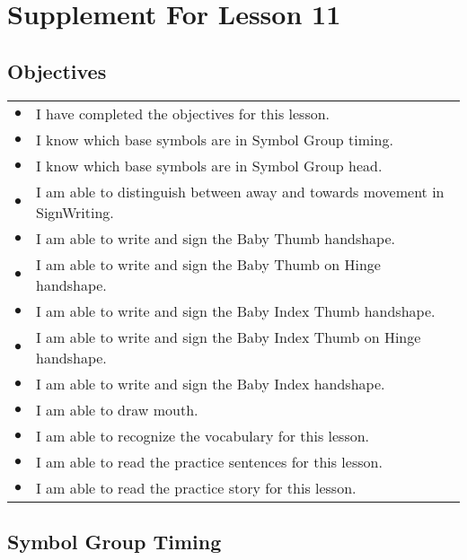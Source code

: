 \documentclass{article}
\begin{document}
\newfontfamily{}
\newfontfamily{}
\newcommand{\bul}{\hfil$\bullet$&}
\renewenvironment{glossary}{\begin{multicols}{5}\begin{center}}{\end{center}\end{multicols}}
\setcounter{secnumdepth}{0}
\setlength{\columnseprule}{1pt}

\section{Supplement For Lesson 11}

\subsection{Objectives}

\begin{tabular}{p{1cm}p{14cm}}
\bul I have completed the objectives for this lesson.\\
\bul I know which base symbols are in Symbol Group timing.\\
\bul I know which base symbols are in Symbol Group head.\\
\bul I am able to distinguish between away and towards movement in SignWriting.\\
\bul I am able to write and sign the Baby Thumb handshape.\\
\bul I am able to write and sign the Baby Thumb on Hinge handshape.\\
\bul I am able to write and sign the Baby Index Thumb handshape.\\
\bul I am able to write and sign the Baby Index Thumb on Hinge handshape.\\
\bul I am able to write and sign the Baby Index handshape.\\
\bul I am able to draw mouth.\\
\bul I am able to recognize the vocabulary for this lesson.\\
\bul I am able to read the practice sentences for this lesson.\\
\bul I am able to read the practice story for this lesson.\\
\end{tabular}

\subsection{Symbol Group Timing}
\end{document}
